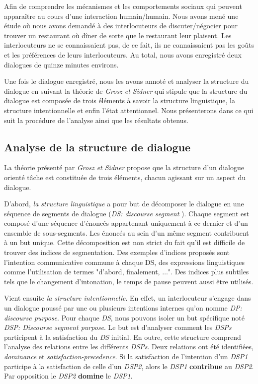 		Afin de comprendre les mécanismes et  les comportements sociaux qui peuvent apparaître au cours d'une interaction humain/humain.
		Nous avons mené une étude où nous avons demandé à des interlocuteurs de discuter/négocier pour trouver un restaurant où dîner de sorte que le restaurant leur plaisent.
		Les interlocuteurs ne se connaissaient pas, de ce fait, ils ne connaissaient pas les goûts et les préférences de leurs interlocuteurs. Au total, nous avons enregistré deux dialogues de quinze minutes environs.
		 	
		Une fois le dialogue enregistré, nous les avons annoté et analyser la structure du dialogue en suivant la théorie de \emph{Grosz et Sidner} \cite{sidner1994artificial} qui stipule que la structure du dialogue est composée de trois éléments à savoir la structure linguistique, la structure intentionnelle et enfin l'état attentionnel.	
		Nous présenterons dans ce qui suit la procédure de l'analyse ainsi que les résultats obtenus. 
		
		\subsection{Analyse de la structure de dialogue}  
			La théorie présenté par \emph{Grosz et Sidner} propose que la structure d'un dialogue orienté tâche est constituée de trois éléments, chacun agissant sur un aspect du dialogue. 
			
			D'abord, \emph{la structure linguistique} a pour but de décomposer le dialogue en une séquence de segments de dialogue (\textit{DS: discourse segment }). Chaque segment est composé d'une séquence d'énoncés appartenant uniquement à ce dernier et d'un ensemble de sous-segments. Les énoncés au sein d'un même segment contribuent à un but unique. Cette décomposition est non strict du fait qu'il est difficile de trouver des indices de segmentation. Des exemples d'indices proposés sont l'intention communicative commune à chaque DS, des expressions  linguistiques comme l'utilisation de termes "d'abord, finalement, $\ldots$". Des indices plus subtiles tels que le changement d'intonation, le temps de pause peuvent aussi être utilisés.
			
			Vient ensuite \emph{la structure intentionnelle}. En effet, un interlocuteur s'engage dans un dialogue poussé par une ou plusieurs intentions internes qu'on nomme \emph{DP: discourse purpose}. Pour chaque \emph{DS}, nous pouvons isoler un but spécifique noté \emph{DSP: Discourse segment purpose}. Le but est d'analyser comment les\emph{ DSPs} participent à la satisfaction du \emph{DS} initial. En outre, cette structure comprend l'analyse des relations entre les différents \emph{DSPs}. Deux relations ont été identifiées, \emph{dominance} et \emph{satisfaction-precedence}. Si la satisfaction de l'intention d'un \emph{DSP1} participe à la satisfaction de celle d'un \emph{DSP2}, alors le \emph{DSP1} \textbf{contribue} au \emph{DSP2}. Par opposition le \emph{DSP2} \textbf{domine} le \emph{DSP1}.
	
